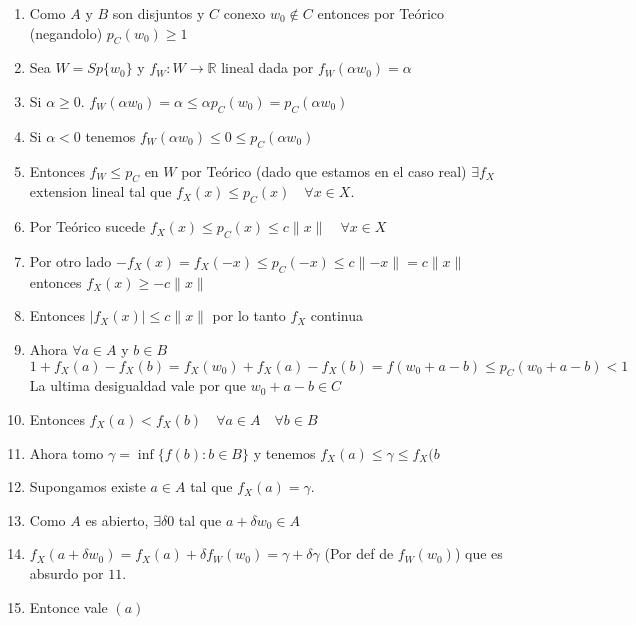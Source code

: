 \documentclass[10pt]{extarticle}
\theoremstyle{break}
\theoremstyle{definition}
\begin{document}
\begin{enumerate}
\item
Como $A$ y $B$ son disjuntos y $C$ conexo $w_{0}\not\in C$ entonces por Teórico (negandolo) $p_{C}(w_{0})\geq 1$
\item
Sea $W=Sp\{ w_{0} \}$ y $f_{W} : W\rightarrow \mathbb{R}$ lineal dada por $f_{W}(\alpha w_{0})=\alpha$
\item
Si $\alpha \geq0$. $f_{W}(\alpha w_{0})=\alpha \leq \alpha p_{C}(w_{0})=p_{C}(\alpha w_{0})$
\item
Si $\alpha <0$ tenemos $f_{W}(\alpha w_{0})\leq 0\leq p_{C}(\alpha w_{0})$
\item
Entonces $f_{W}\leq p_{C}$ en $W$ por Teórico (dado que estamos en el caso real) $\exists f_{X}$ extension lineal tal que $f_{X}(x)\leq p_{C}(x)\quad\forall x\in X$.
\item
Por Teórico sucede $f_{X}(x)\leq p_{C}(x)\leq c\lVert x \rVert\quad\forall x\in X$
\item
Por otro lado $-f_{X}(x)=f_{X}(-x)\leq p_{C}(-x)\leq c\lVert -x \rVert=c\lVert x \rVert$ entonces $f_{X}(x)\geq-c\lVert x \rVert$
\item
Entonces $\lvert f_{X}(x) \rvert\leq c\lVert x \rVert$ por lo tanto $f_{X}$ continua
\item Ahora $\forall a\in A$ y $b\in B$ 
$$1+f_{X}(a)-f_{X}(b)=f_{X}(w_{0})+f_{X}(a)-f_{X}(b)=f(w_{0}+a-b)\leq p_{C}(w_{0}+a-b)<1$$
La ultima desigualdad vale por que $w_{0}+a-b\in C$
\item Entonces $f_{X}(a)<f_{X}(b)\quad \forall a\in A\quad\forall b\in B$
\item Ahora tomo $\gamma=\inf \{ f(b):b\in B \}$ y tenemos $f_{X}(a)\leq \gamma\leq f_{X}(b$
\item Supongamos existe $a\in A$ tal que $f_{X}(a)=\gamma$.
\item Como $A$ es abierto, $\exists \delta0$ tal que $a+\delta w_{0}\in A$
\item $f_{X}(a+\delta w_{0})=f_{X}(a)+\delta f_{W}(w_{0})=\gamma+\delta\gamma$ (Por def de $f_{W}(w_{0})$) que es absurdo por $11.$
\item Entonce vale $(a)$
\end{enumerate}
\end{document}
